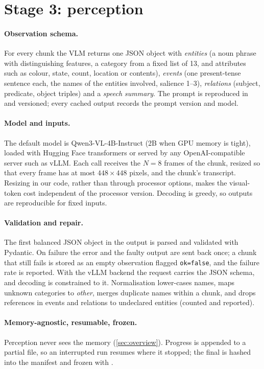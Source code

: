 \section{Stage 3: perception}\label{sec:stage3}

\paragraph{Observation schema.}
For every chunk the VLM returns one JSON object with
\emph{entities} (a noun phrase with distinguishing features, a category from a
fixed list of 13, and attributes such as colour, state, count, location or
contents), \emph{events} (one present-tense sentence each, the names of the
entities involved, salience 1--3), \emph{relations} (subject, predicate,
object triples) and a \emph{speech summary}. The prompt is reproduced in
 and versioned; every cached output records the
prompt version and model.

\paragraph{Model and inputs.}
The default model is Qwen3-VL-4B-Instruct (2B when GPU memory is tight),
loaded with Hugging Face transformers or served by any OpenAI-compatible
server such as vLLM. Each call receives the $N=8$ frames of the chunk, resized
so that every frame has at most $448\times448$ pixels, and the chunk's
transcript. Resizing in our code, rather than through processor options,
makes the visual-token cost independent of the processor version. Decoding is
greedy, so outputs are reproducible for fixed inputs.

\paragraph{Validation and repair.}
The first balanced JSON object in the output is parsed and validated with
Pydantic. On failure the error and the faulty output are sent back once; a
chunk that still fails is stored as an empty observation flagged
\texttt{ok=false}, and the failure rate is reported. With the vLLM backend the
request carries the JSON schema, and decoding is constrained to it.
Normalisation lower-cases names, maps unknown categories to \emph{other},
merges duplicate names within a chunk, and drops references in events and
relations to undeclared entities (counted and reported).

\paragraph{Memory-agnostic, resumable, frozen.}
Perception never sees the memory (\cref{sec:overview}). Progress is appended
to a partial file, so an interrupted run resumes where it stopped; the final
 is hashed into the manifest and frozen with
.


